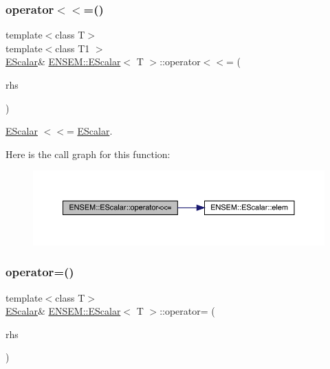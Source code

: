 \subsubsection{\texorpdfstring{operator$<$$<$=()}{operator<<=()}\hspace{0.1cm}{\footnotesize\ttfamily [3/3]}}
{\footnotesize\ttfamily template$<$class T$>$ \\
template$<$class T1 $>$ \\
\mbox{\hyperlink{classENSEM_1_1EScalar}{E\+Scalar}}\& \mbox{\hyperlink{classENSEM_1_1EScalar}{E\+N\+S\+E\+M\+::\+E\+Scalar}}$<$ T $>$\+::operator$<$$<$= (\begin{DoxyParamCaption}\item[{const \mbox{\hyperlink{classENSEM_1_1EScalar}{E\+Scalar}}$<$ T1 $>$ \&}]{rhs }\end{DoxyParamCaption})\hspace{0.3cm}{\ttfamily [inline]}}



\mbox{\hyperlink{classENSEM_1_1EScalar}{E\+Scalar}} $<$$<$= \mbox{\hyperlink{classENSEM_1_1EScalar}{E\+Scalar}}. 

Here is the call graph for this function\+:
\nopagebreak
\begin{figure}[H]
\begin{center}
\leavevmode
\includegraphics[width=350pt]{d0/d82/classENSEM_1_1EScalar_a29ea96dc5698e4541307d65a0f1dfe6e_cgraph}
\end{center}
\end{figure}
\mbox{\label{classENSEM_1_1EScalar_a01ae8ddc1b0d0e4ecd65f5de624faee5}} 
\subsubsection{\texorpdfstring{operator=()}{operator=()}\hspace{0.1cm}{\footnotesize\ttfamily [1/12]}}
{\footnotesize\ttfamily template$<$class T$>$ \\
\mbox{\hyperlink{classENSEM_1_1EScalar}{E\+Scalar}}\& \mbox{\hyperlink{classENSEM_1_1EScalar}{E\+N\+S\+E\+M\+::\+E\+Scalar}}$<$ T $>$\+::operator= (\begin{DoxyParamCaption}\item[{const typename \mbox{\hyperlink{structENSEM_1_1WordType}{Word\+Type}}$<$ T $>$\+::Type\+\_\+t \&}]{rhs }\end{DoxyParamCaption})\hspace{0.3cm}{\ttfamily [inline]}}



